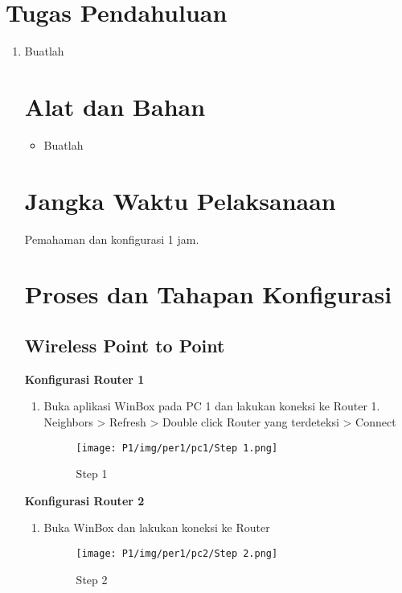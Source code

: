 \section{Tugas Pendahuluan}
\begin{enumerate}
\item Buatlah

\section{Alat dan Bahan}
\begin{itemize}[label=$\bullet$, itemsep=-1pt, leftmargin=*]
	\item Buatlah
\end{itemize}

\section{Jangka Waktu Pelaksanaan}
Pemahaman dan konfigurasi 1 jam.


\section{Proses dan Tahapan Konfigurasi}
\subsection{Wireless Point to Point}
\begin{center}

\textbf{Konfigurasi Router 1}
\begin{enumerate}
	\item Buka aplikasi WinBox pada PC 1 dan lakukan koneksi ke Router 1.\\Neighbors > Refresh > Double click Router yang terdeteksi > Connect
	      \begin{figure}[H]
		      \centering
		      \texttt{[image: P1/img/per1/pc1/Step 1.png]}
		      \caption{Step 1}
		      \label{fig:Step 1(Per.1 PC1)}
	      \end{figure}
\end{enumerate}

\textbf{Konfigurasi Router 2}
\begin{enumerate}
	\item Buka WinBox dan lakukan koneksi ke Router
	      \begin{figure}[H]
		      \centering
		      \texttt{[image: P1/img/per1/pc2/Step 2.png]}
		      \caption{Step 2}
		      \label{fig:Step 2(Per.1 PC2)}
	      \end{figure}
\end{enumerate}


\end{center}
\end{enumerate}
